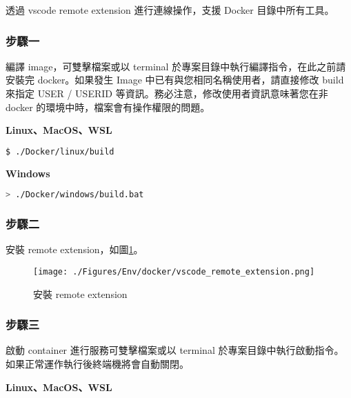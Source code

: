 透過 vscode remote extension 進行連線操作，支援 Docker 目錄中所有工具。

\subsubsection*{步驟一}
編譯 image，可雙擊檔案或以 terminal 於專案目錄中執行編譯指令，在此之前請安裝完 docker。如果發生 Image 中已有與您相同名稱使用者，請直接修改 build 來指定 USER / USERID 等資訊。務必注意，修改使用者資訊意味著您在非 docker 的環境中時，檔案會有操作權限的問題。

\begin{flushleft}
        \textbf{Linux、MacOS、WSL}
\end{flushleft}

\begin{lstlisting}[language=bash]
        $ ./Docker/linux/build
\end{lstlisting}

\begin{flushleft}
        \textbf{Windows}
\end{flushleft}

\begin{lstlisting}[language=bash]
        > ./Docker/windows/build.bat
\end{lstlisting}

\subsubsection*{步驟二}

安裝 remote extension，如圖\ref{fig_vscode_remote_extension}。

\begin{figure}[H] 
        \centering 
        \texttt{[image: ./Figures/Env/docker/vscode\_remote\_extension.png]} 
        \caption{安裝 remote extension}
        \label{fig_vscode_remote_extension}
\end{figure}

\subsubsection*{步驟三}

啟動 container 進行服務可雙擊檔案或以 terminal 於專案目錄中執行啟動指令。如果正常運作執行後終端機將會自動關閉。

\begin{flushleft}
        \textbf{Linux、MacOS、WSL}
\end{flushleft}

